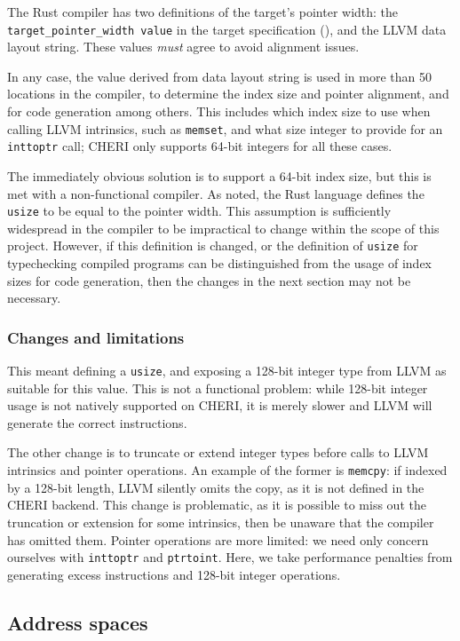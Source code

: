 \documentclass[dissertation.tex]{subfiles}
\begin{document}
The Rust compiler has two definitions of the target's pointer width: the
\texttt{target\_pointer\_width value} in the target specification
(), and the LLVM data layout string.
These values \emph{must} agree to avoid alignment issues.

In any case, the value derived from data layout string is used in more
than 50 locations in the compiler, to determine the index size and
pointer alignment, and for code generation among others.
This includes which index size to use when calling LLVM intrinsics, such
as \texttt{memset}, and what size integer to provide for an
\texttt{inttoptr} call; CHERI only supports 64-bit integers for all
these cases.

The immediately obvious solution is to support a 64-bit index size, but
this is met with a non-functional compiler.
As  noted, the Rust language defines the
\texttt{usize} to be equal to the pointer width.
This assumption is sufficiently widespread in the compiler to be
impractical to change within the scope of this project.
However, if this definition is changed, or the definition of
\texttt{usize} for typechecking compiled programs can be distinguished
from the usage of index sizes for code generation, then the changes in
the next section may not be necessary.


\subsubsection{Changes and limitations}
This meant defining a \texttt{usize}, and exposing a 128-bit integer
type from LLVM as suitable for this value.
This is not a functional problem: while 128-bit integer usage is not
natively supported on CHERI, it is merely slower and LLVM will generate
the correct instructions.

The other change is to truncate or extend integer types before calls to
LLVM intrinsics and pointer operations.
An example of the former is \texttt{memcpy}: if indexed by a 128-bit
length, LLVM silently omits the copy, as it is not defined in the
CHERI backend.
This change is problematic, as it is possible to miss out the truncation
or extension for some intrinsics, then be unaware that the compiler has
omitted them.
Pointer operations are more limited: we need only concern ourselves with
\texttt{inttoptr} and \texttt{ptrtoint}.
Here, we take performance penalties from generating excess instructions
and 128-bit integer operations.


\subsection{Address spaces}
\label{sec:impl-addrspace}
\end{document}
